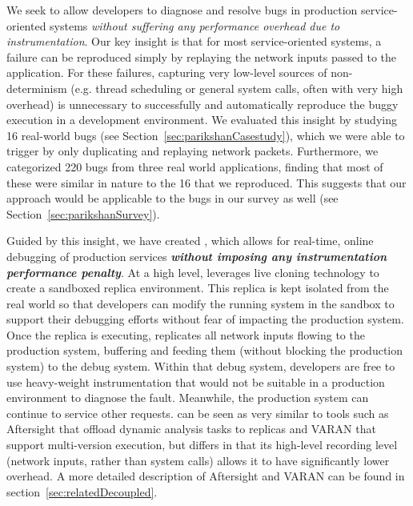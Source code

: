 We seek to allow developers to diagnose and resolve bugs in production service-oriented systems \emph{without suffering any performance overhead due to instrumentation}.
Our key insight is that for most service-oriented systems, a failure can be reproduced simply by replaying the network inputs passed to the application.
For these failures, capturing very low-level sources of non-determinism (e.g. thread scheduling or general system calls, often with very high overhead) is unnecessary to successfully and automatically reproduce the buggy execution in a development environment.
We evaluated this insight by studying 16 real-world bugs (see Section~\ref{sec:parikshanCasestudy}), which we were able to trigger by only duplicating and replaying network packets.
Furthermore, we categorized 220 bugs from three real world applications, finding that most of these were similar in nature to the 16 that we reproduced. 
This suggests that our approach would be applicable to the bugs in our survey as well (see Section~\ref{sec:parikshanSurvey}).


Guided by this insight, we have created \parikshan, which allows for real-time, online debugging of production services \textbf{\emph{without imposing any instrumentation performance penalty}}.
At a high level, \parikshan leverages live cloning technology to create a sandboxed replica environment.
This replica is kept isolated from the real world so that developers can modify the running system in the sandbox to support their debugging efforts without fear of impacting the production system.
Once the replica is executing, \parikshan replicates all network inputs flowing to the production system, buffering and feeding them (without blocking the production system) to the debug system.
Within that debug system, developers are free to use heavy-weight instrumentation that would not be suitable in a production environment to diagnose the fault.
Meanwhile, the production system can continue to service other requests.
\parikshan can be seen as very similar to tools such as Aftersight \cite{aftersight} that offload dynamic analysis tasks to replicas and VARAN \cite{Hosek:2015:VUE:2694344.2694390} that support multi-version execution, but differs in that its high-level recording level (network inputs, rather than system calls) allows it to have significantly lower overhead. A more detailed description of Aftersight and VARAN can be found in section~\ref{sec:relatedDecoupled}.


